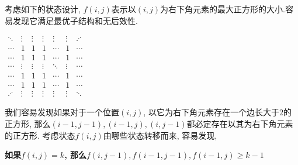 考虑如下的状态设计, $f(i,j)$表示以$(i,j)$为右下角元素的最大正方形的大小.容易发现它满足最优子结构和无后效性.
\begin{center}
	\begin{math}
	\begin{matrix}
	\ddots& \vdots& \vdots& \vdots& \vdots& \vdots& \adots& \\ 
	\cdots& 1     & 1     & 1     & \cdots& 1     & \cdots& \\
	\cdots& 1     & 1     & 1     & \cdots& 1     & \cdots& \\
	\cdots& \vdots& \vdots& \vdots& \ddots& \vdots& \cdots& \\
	\cdots& 1     & 1     & 1     & \cdots& 1     & \cdots& \\
	\cdots& 1     & 1     & 1     &　\cdots& 1     & \cdots& \\ 
	\adots& \vdots& \vdots& \vdots& \vdots& \vdots& \ddots& 
	\end{matrix}
	\end{math}
\end{center}
\par 我们容易发现如果对于一个位置$(i,j)$, 以它为右下角元素存在一个边长大于$2$的正方形, 那么$(i-1,j-1),(i-1,j),(i,j-1)$都必定存在以其为右下角元素的正方形.
考虑状态$f(i,j)$由哪些状态转移而来, 容易发现, \begin{center}\textbf{如果$f(i,j)=k$, 那么$f(i,j-1),f(i-1,j-1),f(i-1,j)\geq k-1$}\end{center}


\note
